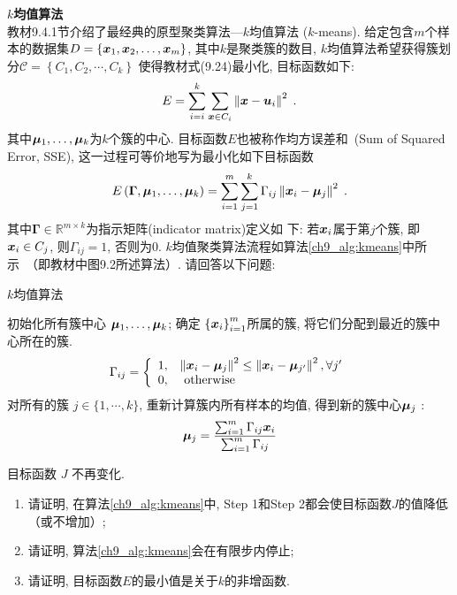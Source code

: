 \documentclass[answers]{exam}  %
\begin{document}
\begin{questions}
\question [20] \textbf{$k$均值算法} \\
\label{ch9_prob:kmeans}
教材9.4.1节介绍了最经典的原型聚类算法---$k$均值算法 ($k$-means). 给定包含$m$个样本的数据集$D =\left\{{\boldsymbol{x}}_{1}, {\boldsymbol{x}}_{2}, \ldots, {\boldsymbol{x}}_{m}\right\}$, 其中$k$是聚类簇的数目, $k$均值算法希望获得簇划分$\mathcal{C}=\left\{C_{1}, C_{2}, \cdots, C_{k}\right\}$
使得教材式(9.24)最小化, 目标函数如下: 
\begin{equation}
 E=\sum_{i=i}^{k}\sum_{{\boldsymbol{x}} \in C_{i}}\left\| {\boldsymbol{x}}-\boldsymbol{u}_{i} \right\|^{2}\;.
\end{equation}
其中$\boldsymbol{\mu}_{1}, \ldots, \boldsymbol{\mu}_{k}$为$k$个簇的中心. 目标函数$E$也被称作均方误差和~(Sum of Squared Error, SSE), 
这一过程可等价地写为最小化如下目标函数
\begin{equation} \label{ch9_kmeans_obj}
E\left(\mathbf{\Gamma}, \boldsymbol{\mu}_{1}, \ldots, \boldsymbol{\mu}_{k}\right)=\sum_{i=1}^{m} \sum_{j=1}^{k} {\Gamma}_{i j}\left\|{\boldsymbol{x}}_{i}-\boldsymbol{\mu}_{j}\right\|^{2}\;.
\end{equation}
其中$\mathbf{\Gamma} \in \mathbb{R}^{m \times k}$为指示矩阵(indicator matrix)定义如
下: 若${\boldsymbol{x}}_{i}$属于第$j$个簇, 即${\boldsymbol{x}}_i\in C_j$, 则${\Gamma}_{i j}=1$, 否则为0.
$k$均值聚类算法流程如算法\ref{ch9_alg:kmeans}中所示~（即教材中图9.2所述算法）. 请回答以下问题: 
{\begin{algorithm}[ht]
		\caption{ $k$均值算法 }
		\label{ch9_alg:kmeans}
		\begin{algorithmic}[1]{
				\State 初始化所有簇中心 $\boldsymbol{\mu}_{1}, \ldots, \boldsymbol{\mu}_{k}$;
				\Repeat
				 确定 $\left\{{\boldsymbol{x}}_{i}\right\}_{i=1}^{m}$所属的簇, 将它们分配到最近的簇中心所在的簇.
				\begin{align}{\Gamma}_{i j}=\left\{\begin{array}{ll}
				1, & \left\|{\boldsymbol{x}}_{i}-\boldsymbol{\mu}_{j}\right\|^{2} \leq \left\|{\boldsymbol{x}}_{i}-\boldsymbol{\mu}_{j^{\prime}}\right\|^{2}, \forall j^{\prime} \\
				0, & \text { otherwise }
				\end{array}\right.\end{align} \label{ch9_:step1}
				 对所有的簇 $j \in\{1, \cdots, k\}$, 重新计算簇内所有样本的均值, 得到新的簇中心$\boldsymbol{\mu}_j$  :
			\begin{align}\boldsymbol{\mu}_{j}=\frac{\sum_{i=1}^{m} {\Gamma}_{i j} {\boldsymbol{x}}_{i}}{\sum_{i=1}^{m} {\Gamma}_{i j}}\end{align}	
		
				\Until 目标函数 $J$ 不再变化.}
		\end{algorithmic}
\end{algorithm}}
\begin{enumerate}
    \item 请证明, 在算法\ref{ch9_alg:kmeans}中, Step 1和Step 2都会使目标函数$J$的值降低（或不增加）;
    \item 请证明, 算法\ref{ch9_alg:kmeans}会在有限步内停止;
    \item 请证明, 目标函数$E$的最小值是关于$k$的非增函数.
\end{enumerate}


\begin{solution}
\end{solution}

\end{questions}
\end{document}
